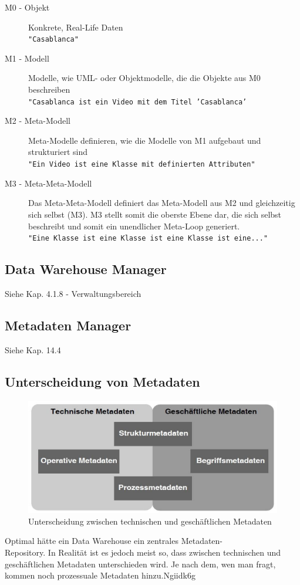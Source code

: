 \documentclass[a4paper, 11pt, nofootinbib]{article}
\newcommand{\code}[1]{\texttt{#1}}
\begin{document}
\begin{description}
	\item[M0 - Objekt] Konkrete, Real-Life Daten\\
		\code{"Casablanca"}
	\item[M1 - Modell] Modelle, wie UML- oder Objektmodelle, die die Objekte aus M0 beschreiben \\
		\code{"Casablanca ist ein Video mit dem Titel 'Casablanca'}
	\item[M2 - Meta-Modell] Meta-Modelle definieren, wie die Modelle von M1 aufgebaut und strukturiert sind \\
		\code{"Ein Video ist eine Klasse mit definierten Attributen"}
	\item[M3 - Meta-Meta-Modell] Das Meta-Meta-Modell definiert das Meta-Modell aus M2 und gleichzeitig sich selbst (M3). M3 stellt somit die oberste Ebene dar, die sich selbst beschreibt und somit ein unendlicher Meta-Loop generiert.\\
		\code{"Eine Klasse ist eine Klasse ist eine Klasse ist eine..."}
\end{description}

\subsection{Data Warehouse Manager}
Siehe Kap. 4.1.8 - Verwaltungsbereich

\subsection{Metadaten Manager}
Siehe Kap. 14.4

\subsection{Unterscheidung von Metadaten}
\begin{figure}
	\centering
	\includegraphics[keepaspectratio=true,height=10\baselineskip]{metadaten.png}
	\caption{Unterscheidung zwischen technischen und geschäftlichen Metadaten}
	\label{fig:metadaten}
\end{figure}
Optimal hätte ein Data Warehouse ein zentrales Metadaten-\\ Repository. In Realität ist es jedoch meist so, dass zwischen technischen und geschäftlichen Metadaten unterschieden wird. Je nach dem, wen man fragt, kommen noch prozessuale Metadaten hinzu.Ngiidk6g
\end{document}
